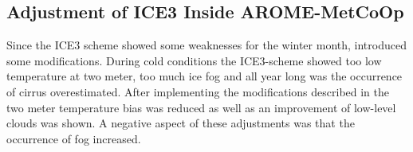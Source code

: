 %
\newpage
\subsection{Adjustment of ICE3 Inside AROME-MetCoOp}
Since the ICE3 scheme showed some weaknesses for the winter month, \cite{muller_arome-metcoop:_2017} introduced some modifications. 
During cold conditions the ICE3-scheme showed too low temperature at two meter, too much ice fog and all year long was the occurrence of cirrus overestimated. After implementing the modifications described in \cite{muller_arome-metcoop:_2017} the two meter temperature bias was reduced as well as an improvement of low-level clouds was shown. A negative aspect of these adjustments was that the occurrence of fog increased.%














